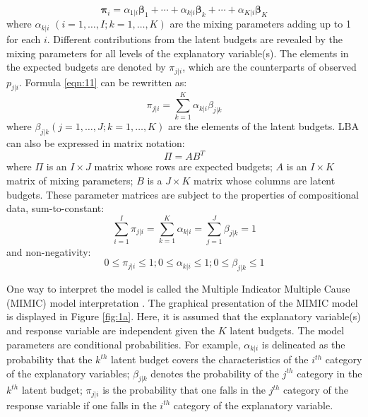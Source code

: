 \documentclass[]{interact}
\theoremstyle{plain}%
\theoremstyle{definition}
\theoremstyle{remark}
\begin{document}
\begin{equation}
\label{eqn:11}
\boldsymbol\pi_i = \alpha_{1|i}\boldsymbol\beta_1 + \cdots + \alpha_{k|i}\boldsymbol\beta_k + \cdots + \alpha_{K|i}\boldsymbol\beta_K \tag{1.1}
\end{equation} where \(\alpha_{k|i}\) \((i=1,\ldots,I;k=1, \ldots,K)\)
are the mixing parameters adding up to 1 for each \(i\). Different
contributions from the latent budgets are revealed by the mixing
parameters for all levels of the explanatory variable(s). The elements
in the expected budgets are denoted by \(\pi_{j|i}\), which are the
counterparts of observed \(p_{j|i}\). Formula \ref{eqn:11} can be
rewritten as: \begin{equation}
  \pi_{j|i} = \sum^K_{k = 1}{\alpha_{k|i} \beta_{j|k}} \tag{1.2}
\end{equation} where \(\beta_{j|k} (j=1,\ldots,J;k=1, \ldots,K)\) are
the elements of the latent budgets. LBA can also be expressed in matrix
notation: \begin{equation}
\Pi = AB^T \tag{1.3}
\end{equation} where \(\Pi\) is an \(I \times J\) matrix whose rows are
expected budgets; \(A\) is an \(I \times K\) matrix of mixing
parameters; \(B\) is a \(J \times K\) matrix whose columns are latent
budgets. These parameter matrices are subject to the properties of
compositional data, sum-to-constant: \begin{equation}
\sum^I_{i=1}{\pi_{j|i}} = \sum^K_{k=1}{\alpha_{k|i}} = \sum^J_{j=1}{\beta_{j|k}} = 1 \tag{1.4}
\end{equation} and non-negativity: \begin{equation}
0 \leq \pi_{j|i} \leq 1; 0 \leq \alpha_{k|i} \leq 1; 0 \leq \beta_{j|k} \leq 1 \tag{1.5}
\end{equation}

\par

One way to interpret the model is called the Multiple Indicator Multiple
Cause (MIMIC) model interpretation \citep{vanderark1998}. The graphical
presentation of the MIMIC model is displayed in Figure \ref{fig:1a}.
Here, it is assumed that the explanatory variable(s) and response
variable are independent given the \(K\) latent budgets. The model
parameters are conditional probabilities. For example, \(\alpha_{k|i}\)
is delineated as the probability that the \(k^{th}\) latent budget
covers the characteristics of the \(i^{th}\) category of the explanatory
variables; \(\beta_{j|k}\) denotes the probability of the \(j^{th}\)
category in the \(k^{th}\) latent budget; \(\pi_{j|i}\) is the
probability that one falls in the \(j^{th}\) category of the response
variable if one falls in the \(i^{th}\) category of the explanatory
variable.
\end{document}
